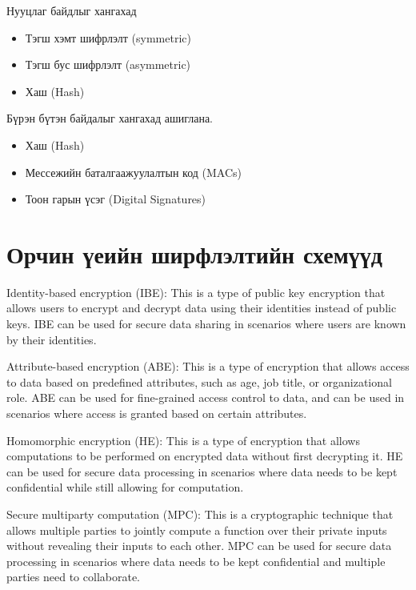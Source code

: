 Нууцлаг байдлыг хангахад
\begin{itemize}
    \item Тэгш хэмт шифрлэлт (symmetric)
    \item Тэгш бус шифрлэлт (asymmetric)
    \item Хаш (Hash)
\end{itemize}

Бүрэн бүтэн байдалыг хангахад ашиглана.
\begin{itemize}
    \item Хаш (Hash)
    \item Мессежийн баталгаажуулалтын код (MACs)
    \item Тоон гарын үсэг (Digital Signatures)
\end{itemize}


\section{Орчин үеийн ширфлэлтийн схемүүд}

Identity-based encryption (IBE): This is a type of public key encryption that allows users to encrypt and decrypt data using their identities instead of public keys. IBE can be used for secure data sharing in scenarios where users are known by their identities.

Attribute-based encryption (ABE): This is a type of encryption that allows access to data based on predefined attributes, such as age, job title, or organizational role. ABE can be used for fine-grained access control to data, and can be used in scenarios where access is granted based on certain attributes.

Homomorphic encryption (HE): This is a type of encryption that allows computations to be performed on encrypted data without first decrypting it. HE can be used for secure data processing in scenarios where data needs to be kept confidential while still allowing for computation.

Secure multiparty computation (MPC): This is a cryptographic technique that allows multiple parties to jointly compute a function over their private inputs without revealing their inputs to each other. MPC can be used for secure data processing in scenarios where data needs to be kept confidential and multiple parties need to collaborate.

